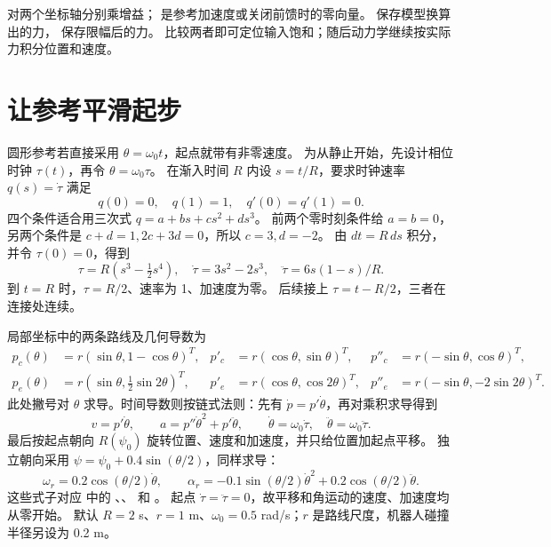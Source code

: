 \par\noindent\begin{minipage}{\linewidth}

\end{minipage}\par
{} 对两个坐标轴分别乘增益； 是参考加速度或关闭前馈时的零向量。
 保存模型换算出的力， 保存限幅后的力。
比较两者即可定位输入饱和；随后动力学继续按实际力积分位置和速度。

\section{让参考平滑起步}
圆形参考若直接采用 $\theta=\omega_0t$，起点就带有非零速度。
为从静止开始，先设计相位时钟 $\tau(t)$，再令 $\theta=\omega_0\tau$。
在渐入时间 $R$ 内设 $s=t/R$，要求时钟速率 $q(s)=\dot\tau$ 满足
\[
 q(0)=0,\quad q(1)=1,\quad q'(0)=q'(1)=0.
\]
四个条件适合用三次式 $q=a+bs+cs^2+ds^3$。
前两个零时刻条件给 $a=b=0$，另两个条件是 $c+d=1,2c+3d=0$，所以 $c=3,d=-2$。
由 $dt=R\,ds$ 积分，并令 $\tau(0)=0$，得到
\begin{equation}
 \tau=R(s^3-\tfrac12s^4),\quad \dot\tau=3s^2-2s^3,\quad
 \ddot\tau=6s(1-s)/R.\label{eq:pdphase}
\end{equation}
到 $t=R$ 时，$\tau=R/2$、速率为 1、加速度为零。
后续接上 $\tau=t-R/2$，三者在连接处连续。

局部坐标中的两条路线及几何导数为
\begin{align*}
 p_c(\theta)&=r(\sin\theta,1-\cos\theta)^T,&
 p'_c&=r(\cos\theta,\sin\theta)^T,&p''_c&=r(-\sin\theta,\cos\theta)^T,\\
 p_e(\theta)&=r(\sin\theta,\tfrac12\sin2\theta)^T,&
 p'_e&=r(\cos\theta,\cos2\theta)^T,&p''_e&=r(-\sin\theta,-2\sin2\theta)^T.
\end{align*}
此处撇号对 $\theta$ 求导。时间导数则按链式法则：先有 $\dot p=p'\dot\theta$，再对乘积求导得到
\[
 v=p'\dot\theta,\qquad a=p''\dot\theta^2+p'\ddot\theta,\qquad
 \dot\theta=\omega_0\dot\tau,\quad\ddot\theta=\omega_0\ddot\tau.
\]
最后按起点朝向 $R(\psi_0)$ 旋转位置、速度和加速度，并只给位置加起点平移。
独立朝向采用 $\psi=\psi_0+0.4\sin(\theta/2)$，同样求导：
\[
 \omega_r=0.2\cos(\theta/2)\dot\theta,\qquad
 \alpha_r=-0.1\sin(\theta/2)\dot\theta^2+0.2\cos(\theta/2)\ddot\theta.
\]
这些式子对应  中的 、、 和 。
起点 $\dot\tau=\ddot\tau=0$，故平移和角运动的速度、加速度均从零开始。
默认 $R=2$ s、$r=1$ m、$\omega_0=0.5$ rad/s；$r$ 是路线尺度，机器人碰撞半径另设为 0.2 m。

